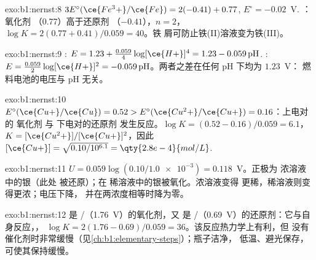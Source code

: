 \begin{solution}{exo:b1:nernst:8}
$3E^\circ(\ce{Fe^3+}/\ce{Fe}) = 2(-0.41) + 0.77$, $E^\circ = -0.02$~V.
：氧化剂 （0.77）高于还原剂
（$-0.41$），$n = 2$，$\log K = 2(0.77 + 0.41)/0.059 = 40$。铁
屑可防止铁(II)溶液变为铁(III)。
\end{solution}

\begin{solution}{exo:b1:nernst:9}
: $E = 1.23 + \frac{0.059}{4}\log [\ce{H+}]^4 =
1.23 - 0.059\,\mathrm{pH}$. : $E = \frac{0.059}{2}\log
[\ce{H+}]^2 = -0.059\,\mathrm{pH}$。两者之差在任何 pH 下均为 $1.23$~V：
燃料电池的电压与 pH 无关。
\end{solution}

\begin{solution}{exo:b1:nernst:10}
$E^\circ(\ce{Cu+}/\ce{Cu}) = 0.52 > E^\circ(\ce{Cu^2+}/\ce{Cu+}) = 0.16$：上电对的
氧化剂  与
下电对的还原剂  发生反应。$\log K = (0.52 - 0.16)/0.059 = 6.1$，$K =
[\ce{Cu^2+}]/[\ce{Cu+}]^2$，因此 $[\ce{Cu+}] = \sqrt{0.10/10^{6.1}} =
\qty{2.8e-4}{mol/L}$.
\end{solution}

\begin{solution}{exo:b1:nernst:11}
$U = 0.059\log(0.10/\num{1.0e-3}) = 0.118$~V。正极为
浓溶液中的银（此处  被还原）；在
稀溶液中的银被氧化。浓溶液变得
更稀，稀溶液则变得更浓；电压下降，
并在两浓度相等时降为零。
\end{solution}

\begin{solution}{exo:b1:nernst:12}
 是 /（1.76~V）的氧化剂，又
是 /（0.69~V）的还原剂：它与自身反应，，
$\log K = 2(1.76 - 0.69)/0.059 = 36$。该反应热力学上有利，但
没有催化剂时非常缓慢（见\cref{ch:b1:elementary-steps}）；瓶子洁净，
低温、避光保存，可使其保持缓慢。
\end{solution}

